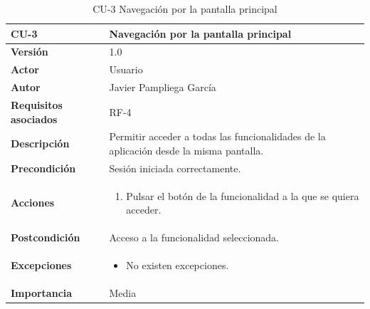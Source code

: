 \begin{table}[p]
	\centering
	\begin{tabularx}{\linewidth}{ p{} p{} }
		\toprule
		\textbf{CU-3}    & \textbf{Navegación por la pantalla principal}\\
		\toprule
		\textbf{Versión}              & 1.0    \\
            \textbf{Actor}                & Usuario \\
		\textbf{Autor}                & Javier Pampliega García \\
		\textbf{Requisitos asociados} & RF-4\\
		\textbf{Descripción}          & Permitir acceder a todas las funcionalidades de la aplicación desde la misma pantalla. \\
		\textbf{Precondición}         & Sesión iniciada correctamente. \\
		\textbf{Acciones}             &
		\begin{enumerate}
			\def\labelenumi{\arabic{enumi}.}
			\tightlist
			\item Pulsar el botón de la funcionalidad a la que se quiera acceder.
		\end{enumerate}\\
		\textbf{Postcondición}        & Acceso a la funcionalidad seleccionada. \\
		\textbf{Excepciones}          & \begin{itemize}
		    \item No existen excepciones.
		\end{itemize} \\
		\textbf{Importancia}          & Media \\
		\bottomrule
	\end{tabularx}
	\caption{CU-3 Navegación por la pantalla principal}
\end{table}

